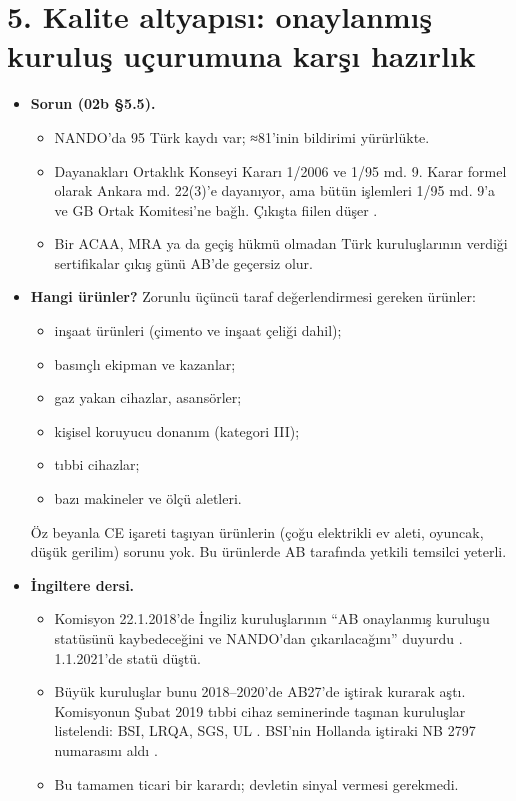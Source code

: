 \endgroup

\hypertarget{02c_hazirlik-5-kalite-altyapux131sux131-onaylanmux131ux15f-kuruluux15f-uuxe7urumuna-karux15fux131-hazux131rlux131k}{%
\section{5. Kalite altyapısı: onaylanmış kuruluş uçurumuna karşı hazırlık}\label{02c_hazirlik-5-kalite-altyapux131sux131-onaylanmux131ux15f-kuruluux15f-uuxe7urumuna-karux15fux131-hazux131rlux131k}}

\begin{itemize}
\item
  \textbf{Sorun (02b §5.5).}

  \begin{itemize}
  \tightlist
  \item
    NANDO'da 95 Türk kaydı var; ≈81'inin bildirimi yürürlükte.
  \item
    Dayanakları Ortaklık Konseyi Kararı 1/2006 ve 1/95 md. 9. Karar formel olarak Ankara md. 22(3)'e dayanıyor, ama bütün işlemleri 1/95 md. 9'a ve GB Ortak Komitesi'ne bağlı. Çıkışta fiilen düşer \etiketV{}.
  \item
    Bir ACAA, MRA ya da geçiş hükmü olmadan Türk kuruluşlarının verdiği sertifikalar çıkış günü AB'de geçersiz olur.
  \end{itemize}
\item
  \textbf{Hangi ürünler?} Zorunlu üçüncü taraf değerlendirmesi gereken ürünler:

  \begin{itemize}
  \tightlist
  \item
    inşaat ürünleri (çimento ve inşaat çeliği dahil);
  \item
    basınçlı ekipman ve kazanlar;
  \item
    gaz yakan cihazlar, asansörler;
  \item
    kişisel koruyucu donanım (kategori III);
  \item
    tıbbi cihazlar;
  \item
    bazı makineler ve ölçü aletleri.
  \end{itemize}

  Öz beyanla CE işareti taşıyan ürünlerin (çoğu elektrikli ev aleti, oyuncak, düşük gerilim) sorunu yok. Bu ürünlerde AB tarafında yetkili temsilci yeterli.
\item
  \textbf{İngiltere dersi.}

  \begin{itemize}
  \tightlist
  \item
    Komisyon 22.1.2018'de İngiliz kuruluşlarının ``AB onaylanmış kuruluşu statüsünü kaybedeceğini ve NANDO'dan çıkarılacağını'' duyurdu \etiketV{}. 1.1.2021'de statü düştü.
  \item
    Büyük kuruluşlar bunu 2018--2020'de AB27'de iştirak kurarak aştı. Komisyonun Şubat 2019 tıbbi cihaz seminerinde taşınan kuruluşlar listelendi: BSI, LRQA, SGS, UL \etiketV{}. BSI'nin Hollanda iştiraki NB 2797 numarasını aldı \etiketT{}.
  \item
    Bu tamamen ticari bir karardı; devletin sinyal vermesi gerekmedi.
  \end{itemize}
\end{itemize}

